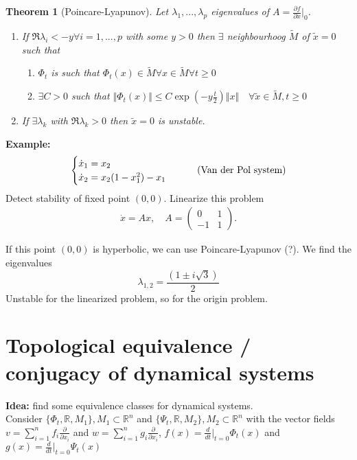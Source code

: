 \documentclass{article}
\newtheorem*{theorem}{Theorem}
\theoremstyle{named}
\begin{document}
\begin{theorem}[Poincare-Lyapunov]
Let $\lambda_1,...,\lambda_p$ eigenvalues of $A = \frac{\partial f}{\partial x}\Big \vert_0$.
\begin{enumerate}
	\item If $\Re \lambda_i < -y \forall i = 1,..., p$ with some $y > 0$ then $\exists$ neighbourhoog $\tilde M$ of $\tilde x=0$ such that
	\begin{enumerate}
		\item $\Phi_t$ is such that $\Phi_t(x) \in \tilde M \forall x \in \tilde M \forall t \geq 0$
		\item $\exists C > 0$ such that $\Vert \Phi_t(x) \Vert \leq C \exp(-y\frac{t}{2}) \Vert x \Vert \quad  \forall \tilde x \in \tilde M, t \geq 0$
	\end{enumerate}

	\item If $\exists \lambda_k$ with $\Re \lambda_k > 0$ then $\tilde x = 0$ is unstable.
\end{enumerate}
\end{theorem}

\textbf{Example:} 
\begin{align*}
\begin{cases}
\dot x_1 = x_2 \\
\dot x_2 = x_2(1-x_1^2)- x_1
\end{cases} \tag{\text{Van der Pol system}}
\end{align*}
Detect stability of fixed point $(0,0)$. Linearize this problem
\begin{align*}
\dot x = Ax, \quad A = \begin{pmatrix}
0 & 1 \\ -1 & 1
\end{pmatrix}.
\end{align*}

If this point $(0,0)$ is hyperbolic, we can use Poincare-Lyapunov (?). We find the eigenvalues
\[
	\lambda_{1,2} = \frac{(1 \pm i \sqrt 3)}{2}
\]
Unstable for the linearized problem, so for the origin problem. \\

\section*{Topological equivalence / conjugacy of dynamical systems}
\textbf{Idea:} find some equivalence classes for dynamical systems.\\

Consider $\{ \Phi_t, \mathbb R, M_1 \}, M_1 \subset \mathbb R^n$ and $\{ \Psi_t, \mathbb R, M_2 \}, M_2 \subset \mathbb R^n$ with the vector fields $v = \sum^n_{i=1} f_i \frac{\partial}{\partial x_i}$ and $w = \sum^n_{i=1} g_i \frac{\partial}{\partial x_i}$, $f(x) = \frac{d}{dt} \Big \vert_{t=0} \Phi_t(x)$ and $g(x) = \frac{d}{dt} \Big \vert_{t=0} \Psi_t(x)$
\end{document}
